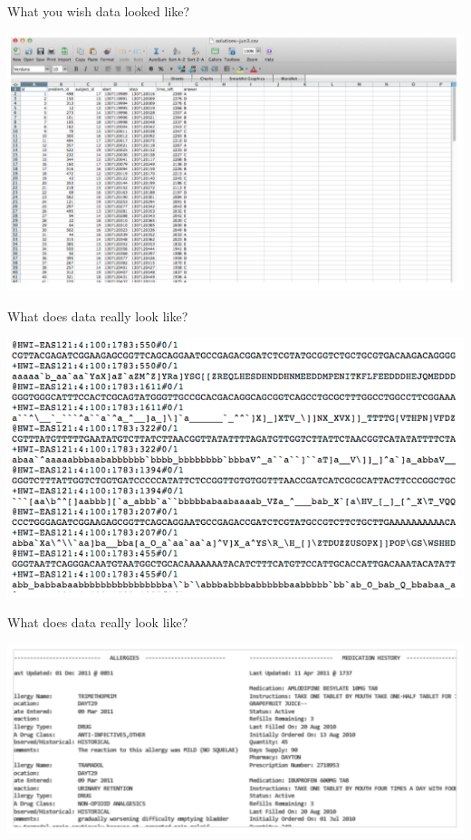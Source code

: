 \documentclass{beamer}
\begin{document}
\begin{frame}{What you wish data looked like?}
    \begin{center}
        \includegraphics[scale=0.3]{dataIdeal.png}
    \end{center}
\end{frame}
\begin{frame}{What does data really look like?}
    \begin{center}
        \includegraphics[scale=0.24]{dataActual.png}
    \end{center}
\end{frame}
\begin{frame}{What does data really look like?}
    \begin{center}
        \includegraphics[scale=0.3]{dataActual2.png}
    \end{center}
\end{frame}
\end{document}
